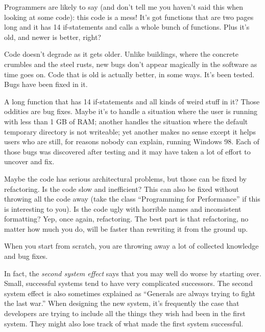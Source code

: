 Programmers are likely to say (and don't tell me you haven't said this when looking at some code): this code is a mess! It's got functions that are two pages long and it has 14 if-statements and calls a whole bunch of functions. Plus it's old, and newer is better, right?

Code doesn't degrade as it gets older. Unlike buildings, where the concrete crumbles and the steel rusts, new bugs don't appear magically in the software as time goes on. Code that is old is actually better, in some ways. It's been tested. Bugs have been fixed in it.

A long function that has 14 if-statements and all kinds of weird stuff in it? Those oddities are bug fixes. Maybe it's to handle a situation where the user is running with less than 1 GB of RAM; another handles the situation where the default temporary directory is not writeable; yet another makes no sense except it helps users who are still, for reasons nobody can explain, running Windows 98. Each of those bugs was discovered after testing and it may have taken a lot of effort to uncover and fix.

Maybe the code has serious architectural problems, but those can be fixed by refactoring. Is the code slow and inefficient? This can also be fixed without throwing all the code away (take the class ``Programming for Performance'' if this is interesting to you). Is the code ugly with horrible names and inconsistent formatting? Yep, once again, refactoring. The best part is that refactoring, no matter how much you do, will be faster than rewriting it from the ground up.

When you start from scratch, you are throwing away a lot of collected knowledge and bug fixes.

In fact, the \emph{second system effect} says that you may well do worse by starting over. Small, successful systems tend to have very complicated successors. The second system effect is also sometimes explained as ``Generals are always trying to fight the last war.'' When designing the new system, it's frequently the case that developers are trying to include all the things they wish had been in the first system. They might also lose track of what made the first system successful.



